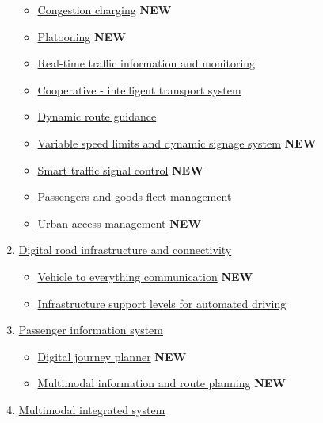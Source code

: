 \documentclass[
]{book}
\providecommand{\tightlist}{%
  \setlength{\itemsep}{0pt}\setlength{\parskip}{0pt}}
\begin{document}
\begin{enumerate}
  \begin{itemize}
  \tightlist
  \item
    \protect\hyperlink{congestion_charging}{Congestion charging} \textbf{NEW}
  \item
    \protect\hyperlink{platooning}{Platooning} \textbf{NEW}
  \item
    \protect\hyperlink{traffic_info_monitoring}{Real-time traffic information and monitoring}
  \item
    \protect\hyperlink{cits}{Cooperative - intelligent transport system}
  \item
    \protect\hyperlink{dynamic_route}{Dynamic route guidance}
  \item
    \protect\hyperlink{variable_speed}{Variable speed limits and dynamic signage system} \textbf{NEW}
  \item
    \protect\hyperlink{adaptive_traffic_control}{Smart traffic signal control} \textbf{NEW}
  \item
    \protect\hyperlink{p_g_fleet_management}{Passengers and goods fleet management}
  \item
    \protect\hyperlink{urban_access}{Urban access management} \textbf{NEW}
  \end{itemize}
\item
  \protect\hyperlink{digital}{Digital road infrastructure and connectivity}

  \begin{itemize}
  \tightlist
  \item
    \protect\hyperlink{v2x}{Vehicle to everything communication} \textbf{NEW}
  \item
    \protect\hyperlink{infrast_support_level}{Infrastructure support levels for automated driving}
  \end{itemize}
\item
  \protect\hyperlink{passenger}{Passenger information system}

  \begin{itemize}
  \tightlist
  \item
    \protect\hyperlink{djp}{Digital journey planner} \textbf{NEW}
  \item
    \protect\hyperlink{info_and_route_planning}{Multimodal information and route planning} \textbf{NEW}
  \end{itemize}
\item
  \protect\hyperlink{multimodal}{Multimodal integrated system}


\end{enumerate}
\end{document}
